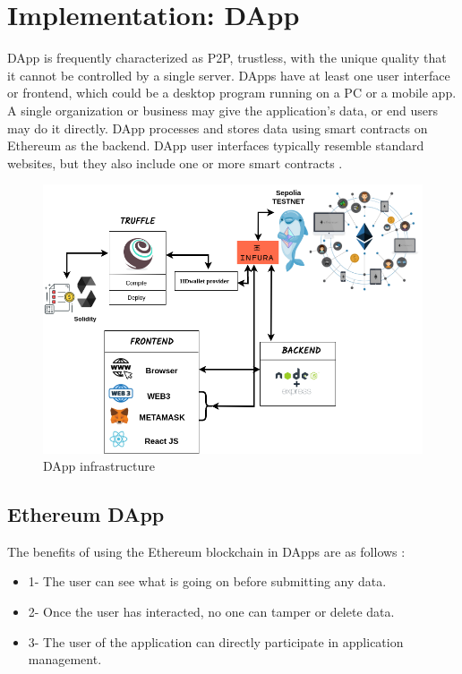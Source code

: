 \chapter{Implementation: DApp}
DApp is frequently characterized as P2P, trustless, with the unique quality that it cannot be controlled by a single server. DApps have at least one user interface or frontend, which could be a desktop program running on a PC or a mobile app.
A single organization or business may give the application's data, or end users may do it directly.
DApp processes and stores data using smart contracts on Ethereum as the backend. DApp user interfaces typically resemble standard websites, but they also include one or more smart contracts \cite{William}.

\begin{center}
	
	\begin{figure}[htb!]
		
		\begin{minipage}{0.75\linewidth}
			
			\includegraphics[width=1.45\textwidth]{images/chap03_dapp.png}
		\end{minipage}
		\caption{DApp infrastructure}
		
	\end{figure}
	
\end{center}

\section{Ethereum DApp}
The benefits of using the Ethereum blockchain in DApps are as follows \cite{William}:
\begin{itemize}
    \item 1- The user can see what is going on before submitting any data.
    \item 2- Once the user has interacted, no one can tamper or delete data.
    \item 3- The user of the application can directly participate in application management.
\end{itemize}
